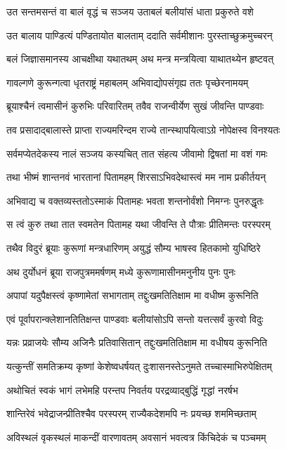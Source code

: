 \twolineshloka
{उत सन्तमसन्तं वा बालं वृद्धं च सञ्जय}
{उताबलं बलीयांसं धाता प्रकुरुते वशे}


\twolineshloka
{उत बालाय पाण्डित्यं पण्डितायोत बालताम्}
{ददाति सर्वमीशानः पुरस्ताच्छुक्रमुच्चरन्}


\twolineshloka
{बलं जिज्ञासमानस्य आचक्षीथा यथातथम्}
{अथ मन्त्र मन्त्रयित्वा याथातथ्येन हृष्टवत्}


\twolineshloka
{गावल्गणे कुरून्गत्वा धृतराष्ट्रं महाबलम्}
{अभिवाद्योपसंगृह्य ततः पृच्छेरनामयम्}


\twolineshloka
{ब्रूयाश्चैनं त्वमासीनं कुरुभिः परिवारितम्}
{तवैव राजन्वीर्येण सुखं जीवन्ति पाण्डवाः}


\twolineshloka
{तव प्रसादाद्बालास्ते प्राप्ता राज्यमरिन्दम}
{राज्ये तान्स्थापयित्वाऽग्रे नोपेक्षस्व विनश्यतः}


\twolineshloka
{सर्वमप्येतदेकस्य नालं सञ्जय कस्यचित्}
{तात संहत्य जीवामो द्विषतां मा वशं गमः}


\twolineshloka
{तथा भीष्मं शान्तनवं भारतानां पितामहम्}
{शिरसाऽभिवदेथास्त्वं मम नाम प्रकीर्तयन्}


\twolineshloka
{अभिवाद्य च वक्तव्यस्ततोऽस्माकं पितामहः}
{भवता शन्तनोर्वंशो निमग्नः पुनरुद्धृतः}


\twolineshloka
{स त्वं कुरु तथा तात स्वमतेन पितामह}
{यथा जीवन्ति ते पौत्राः प्रीतिमन्तः परस्परम्}


\twolineshloka
{तथैव विदुरं ब्रूयाः कुरूणां मन्त्रधारिणम्}
{अयुद्धं सौम्य भाषस्व हितकामो युधिष्ठिरे}


\twolineshloka
{अथ दुर्योधनं ब्रूया राजपुत्रममर्षणम्}
{मध्ये कुरूणामासीनमनुनीय पुनः पुनः}


\twolineshloka
{अपापां यदुपैक्षस्त्वं कृष्णामेतां सभागताम्}
{तद्दुःखमतितिक्षाम मा वधीष्म कुरूनिति}


\twolineshloka
{एवं पूर्वापरान्क्लेशानतितिक्षन्त पाण्डवाः}
{बलीयांसोऽपि सन्तो यत्तत्सर्वं कुरवो विदुः}


\twolineshloka
{यन्नः प्रव्राजयेः सौम्य अजिनैः प्रतिवासितान्}
{तद्दुःखमतितिक्षाम मा वधीषय कुरूनिति}


\twolineshloka
{यत्कुन्तीं समतिक्रम्य कृष्णां केशेष्वधर्षयत्}
{दुःशासनस्तेऽनुमते तच्चास्माभिरुपेक्षितम्}


\twolineshloka
{अथोचितं स्वकं भागं लभेमहि परन्तप}
{निवर्तय परद्रव्याद्बुद्धिं गृद्धां नरर्षभ}


\twolineshloka
{शान्तिरेवं भवेद्राजन्प्रीतिश्चैव परस्परम्}
{राज्यैकदेशमपि नः प्रयच्छ शममिच्छताम्}


\twolineshloka
{अविस्थलं वृकस्थलं माकन्दीं वारणावतम्}
{अवसानं भवत्वत्र किंचिदेकं च पञ्चमम्}


